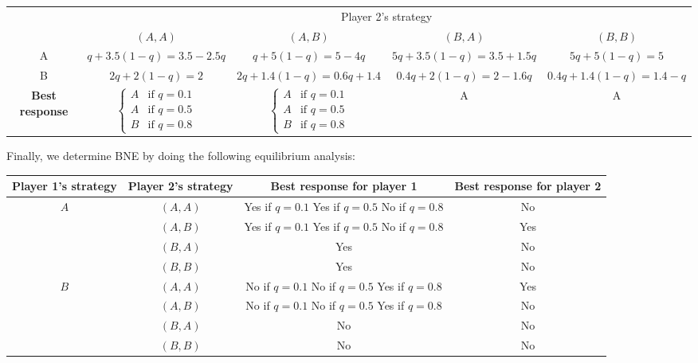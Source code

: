 \documentclass[twoside]{article}
\theoremstyle{definitionstyle}
\begin{document}
\begin{center}
    \small
    \begin{tabular}{ccccc}
        \toprule
        & \multicolumn{4}{c}{Player 2's strategy} \\
        & $(A, A)$ & $(A, B)$ & $(B, A)$ & $(B, B)$ \\
        \midrule
        A & $q + 3.5(1 - q) = 3.5 - 2.5q$ & $q + 5(1 - q) = 5 - 4q$ & $5q + 3.5(1 - q) = 3.5 + 1.5q$ & $5q + 5(1 - q) = 5$ \\
        \addlinespace
        B & $2q + 2(1 - q) = 2$ & $2q + 1.4(1 - q) = 0.6q + 1.4$ & $0.4q + 2(1 - q) = 2 - 1.6q$ & $0.4q + 1.4(1 - q) = 1.4 - q$ \\
        \midrule
        \textbf{Best response} & 
        $\begin{cases} A & \text{if } q = 0.1 \\ A & \text{if } q = 0.5 \\ B & \text{if } q = 0.8 \end{cases}$ & 
        $\begin{cases} A & \text{if } q = 0.1 \\ A & \text{if } q = 0.5 \\ B & \text{if } q = 0.8 \end{cases}$ & 
        A & 
        A \\
        \bottomrule
    \end{tabular}
\end{center}

\noindent Finally, we determine BNE by doing the following equilibrium analysis:

\begin{center}
    \small
    \begin{tabular}{cccc}
        \toprule
        Player 1's strategy & Player 2's strategy & Best response for player 1 & Best response for player 2 \\
        \midrule
        $A$ & $(A, A)$ & Yes if $q = 0.1$ Yes if $q = 0.5$ No if $q = 0.8$ & No \\
        & $(A, B)$ & Yes if $q = 0.1$ Yes if $q = 0.5$ No if $q = 0.8$ & Yes \\
        & $(B, A)$ & Yes & No \\
        & $(B, B)$ & Yes & No \\
        \midrule
        $B$ & $(A, A)$ & No if $q = 0.1$ No if $q = 0.5$ Yes if $q = 0.8$ & Yes \\
        & $(A, B)$ & No if $q = 0.1$ No if $q = 0.5$ Yes if $q = 0.8$ & No \\
        & $(B, A)$ & No & No \\
        & $(B, B)$ & No & No \\
        \bottomrule
    \end{tabular}
\end{center}
\end{document}
